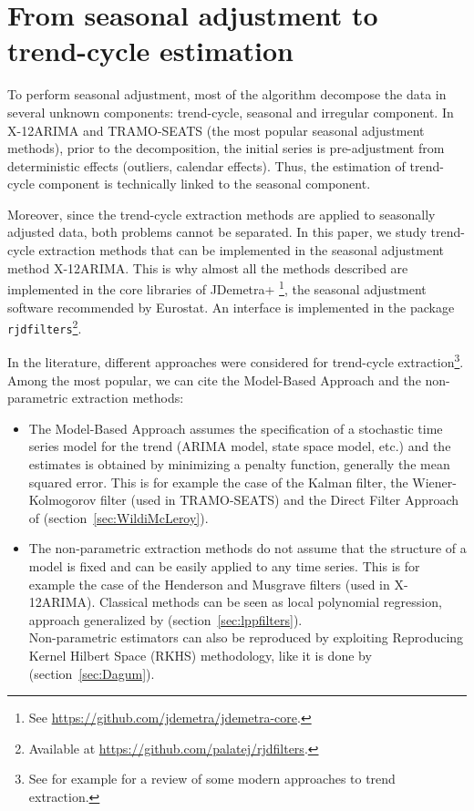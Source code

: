 \documentclass[fleqn,10pt]{latex/stylish_article} %
\newcommand\1{\mathds{1}}
\begin{document}
\hypertarget{sec:SAtoTCE}{%
\section{From seasonal adjustment to trend-cycle estimation}\label{sec:SAtoTCE}}

To perform seasonal adjustment, most of the algorithm decompose the data in several unknown components: trend-cycle, seasonal and irregular component.
In X-12ARIMA and TRAMO-SEATS (the most popular seasonal adjustment methods), prior to the decomposition, the initial series is pre-adjustment from deterministic effects (outliers, calendar effects).
Thus, the estimation of trend-cycle component is technically linked to the seasonal component.

Moreover, since the trend-cycle extraction methods are applied to seasonally adjusted data, both problems cannot be separated. In this paper, we study trend-cycle extraction methods that can be implemented in the seasonal adjustment method X-12ARIMA.
This is why almost all the methods described are implemented in the core libraries of JDemetra+ \footnote{See \url{https://github.com/jdemetra/jdemetra-core}.}, the seasonal adjustment software recommended by Eurostat.
An  interface is implemented in the package \texttt{rjdfilters}\footnote{Available at \url{https://github.com/palatej/rjdfilters}.}.

In the literature, different approaches were considered for trend-cycle extraction\footnote{See for example \citet{alexandrov2012TEreview} for a review of some modern approaches to trend extraction.}.
Among the most popular, we can cite the Model-Based Approach and the non-parametric extraction methods:

\begin{itemize}
\item
  The Model-Based Approach assumes the specification of a stochastic time series model for the trend (ARIMA model, state space model, etc.) and the estimates is obtained by minimizing a penalty function, generally the mean squared error.
  This is for example the case of the Kalman filter, the Wiener-Kolmogorov filter (used in TRAMO-SEATS) and the Direct Filter Approach of \citet{trilemmaWMR2019} (section~\ref{sec:WildiMcLeroy}).
\item
  The non-parametric extraction methods do not assume that the structure of a model is fixed and can be easily applied to any time series.
  This is for example the case of the Henderson and Musgrave filters (used in X-12ARIMA).
  Classical methods can be seen as local polynomial regression, approach generalized by \citet{proietti2008} (section~\ref{sec:lppfilters}).\\
  Non-parametric estimators can also be reproduced by exploiting Reproducing Kernel Hilbert Space (RKHS) methodology, like it is done by
  \citet{dagumbianconcini2008} (section~\ref{sec:Dagum}).
\end{itemize}
\end{document}
